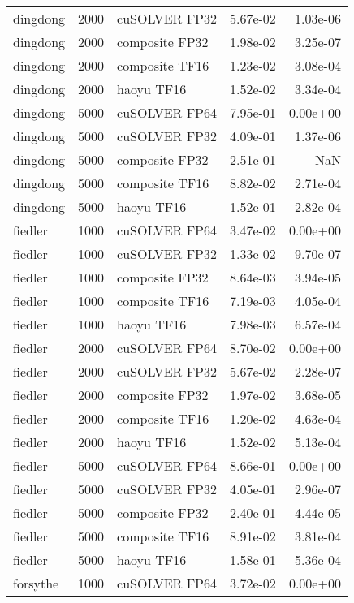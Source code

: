 \begin{table}
\begin{tabular}{lrlrr}
 dingdong &  2000 &  cuSOLVER FP32 &  5.67e-02 &        1.03e-06 \\
 dingdong &  2000 & composite FP32 &  1.98e-02 &        3.25e-07 \\
 dingdong &  2000 & composite TF16 &  1.23e-02 &        3.08e-04 \\
 dingdong &  2000 &     haoyu TF16 &  1.52e-02 &        3.34e-04 \\
 dingdong &  5000 &  cuSOLVER FP64 &  7.95e-01 &        0.00e+00 \\
 dingdong &  5000 &  cuSOLVER FP32 &  4.09e-01 &        1.37e-06 \\
 dingdong &  5000 & composite FP32 &  2.51e-01 &             NaN \\
 dingdong &  5000 & composite TF16 &  8.82e-02 &        2.71e-04 \\
 dingdong &  5000 &     haoyu TF16 &  1.52e-01 &        2.82e-04 \\
  fiedler &  1000 &  cuSOLVER FP64 &  3.47e-02 &        0.00e+00 \\
  fiedler &  1000 &  cuSOLVER FP32 &  1.33e-02 &        9.70e-07 \\
  fiedler &  1000 & composite FP32 &  8.64e-03 &        3.94e-05 \\
  fiedler &  1000 & composite TF16 &  7.19e-03 &        4.05e-04 \\
  fiedler &  1000 &     haoyu TF16 &  7.98e-03 &        6.57e-04 \\
  fiedler &  2000 &  cuSOLVER FP64 &  8.70e-02 &        0.00e+00 \\
  fiedler &  2000 &  cuSOLVER FP32 &  5.67e-02 &        2.28e-07 \\
  fiedler &  2000 & composite FP32 &  1.97e-02 &        3.68e-05 \\
  fiedler &  2000 & composite TF16 &  1.20e-02 &        4.63e-04 \\
  fiedler &  2000 &     haoyu TF16 &  1.52e-02 &        5.13e-04 \\
  fiedler &  5000 &  cuSOLVER FP64 &  8.66e-01 &        0.00e+00 \\
  fiedler &  5000 &  cuSOLVER FP32 &  4.05e-01 &        2.96e-07 \\
  fiedler &  5000 & composite FP32 &  2.40e-01 &        4.44e-05 \\
  fiedler &  5000 & composite TF16 &  8.91e-02 &        3.81e-04 \\
  fiedler &  5000 &     haoyu TF16 &  1.58e-01 &        5.36e-04 \\
 forsythe &  1000 &  cuSOLVER FP64 &  3.72e-02 &        0.00e+00 \\

\end{tabular}
\end{table}
